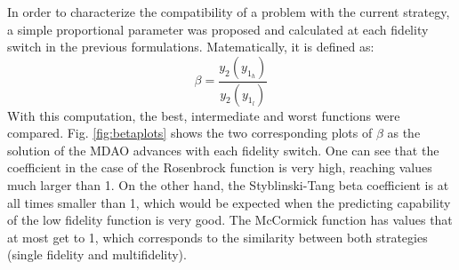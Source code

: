 \documentclass[conf]{new-aiaa}
\begin{document}
\begin{table}[htpb]
\caption{Optimizer iterations needed to converge to a minimum, various formulations.}
\label{tab:Analytical}
\end{table}

In order to characterize the compatibility of a problem with the current strategy, a simple proportional parameter was proposed and calculated at each fidelity switch in the previous formulations. Matematically, it is defined as: \begin{equation}
    \beta=\frac{y_2(y_{1_{h}})}{y_2(y_{1_{l}})}
\end{equation}
With this computation, the best, intermediate and worst functions were compared. Fig. \ref{fig:betaplots} shows the two corresponding plots of $\beta$ as the solution of the MDAO advances with each fidelity switch. One can see that the coefficient in the case of the Rosenbrock function is very high, reaching values much larger than 1. On the other hand, the Styblinski-Tang beta coefficient is at all times smaller than 1, which would be expected when the predicting capability of the low fidelity function is very good. The McCormick function has values that at most get to 1, which corresponds to the similarity between both strategies (single fidelity and multifidelity). 
\end{document}
